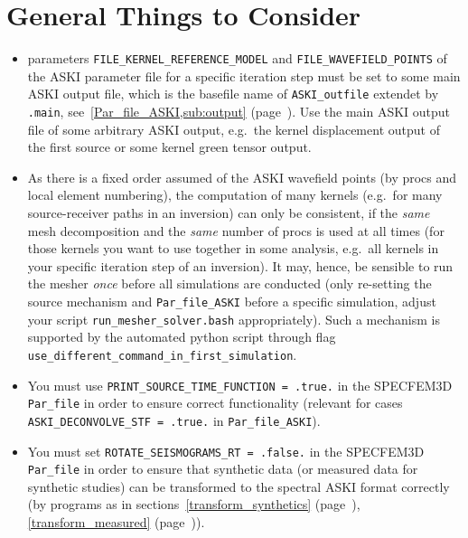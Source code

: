 \documentclass[12pt,a4paper]{article}
\newcommand{\lcode}[1]{\nolinkurl{#1}}
\newcommand{\ASKI}{ {\ttfamily ASKI} }
\newcommand{\myref}[1]{\ref{#1} (page~\pageref{#1})}
\begin{document}
\section{General Things to Consider} \label{general_stuff}
%
\begin{itemize}
\item parameters \lcode{FILE_KERNEL_REFERENCE_MODEL} and \lcode{FILE_WAVEFIELD_POINTS} 
  of the \ASKI{} parameter file for a specific iteration step must be set to some main \ASKI{} output file,
  which is the basefile name of \lcode{ASKI_outfile} extendet by \lcode{.main}, see~\myref{Par_file_ASKI,sub:output}.
  Use the main \ASKI{} output file of some arbitrary \ASKI{} output, e.g.\ the kernel displacement output of the first source
  or some kernel green tensor output.
\item As there is a fixed order assumed of the \ASKI{} wavefield points (by procs and local element numbering), the 
  computation of many kernels (e.g.\ for many source-receiver paths in an inversion) can only be consistent, if the 
  \emph{same} mesh decomposition and the \emph{same} number of procs is used at all times 
  (for those kernels you want to use together in some analysis, e.g.\ all kernels in your specific iteration 
  step of an inversion).
  It may, hence, be sensible to run the mesher \emph{once} before all simulations are conducted (only re-setting the
  source mechanism and \lcode{Par_file_ASKI} before a specific simulation, adjust your 
  script \lcode{run_mesher_solver.bash} appropriately). Such a mechanism is supported by the automated python script
  through flag \lcode{use_different_command_in_first_simulation}.
\item You must use \lcode{PRINT_SOURCE_TIME_FUNCTION = .true.} in the SPECFEM3D \lcode{Par_file} in order to ensure correct
  functionality (relevant for cases \lcode{ASKI_DECONVOLVE_STF = .true.} in \lcode{Par_file_ASKI}).
\item You must set \lcode{ROTATE_SEISMOGRAMS_RT = .false.} in the SPECFEM3D \lcode{Par_file} in order to ensure that 
  synthetic data (or measured data for synthetic studies) can be transformed to the spectral \ASKI{} format correctly (by programs
  as in sections~\myref{transform_synthetics}, \myref{transform_measured}).
\end{itemize}
%
\end{document}
